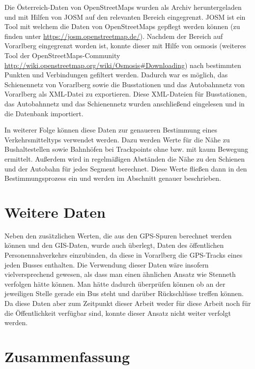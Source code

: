 Die Österreich-Daten von OpenStreetMaps wurden als Archiv heruntergeladen und mit Hilfen von JOSM auf den relevanten Bereich eingegrenzt. JOSM ist ein Tool mit welchem die Daten von OpenStreetMaps gepflegt werden können (zu finden unter \url{https://josm.openstreetmap.de/}). Nachdem der Bereich auf Vorarlberg eingegrenzt worden ist, konnte dieser mit Hilfe von osmosis (weiteres Tool der OpenStreetMaps-Community \url{http://wiki.openstreetmap.org/wiki/Osmosis#Downloading}) nach bestimmten Punkten und Verbindungen gefiltert werden. Dadurch war es möglich, das Schienennetz von Vorarlberg sowie die Busstationen und das Autobahnnetz von Vorarlberg als XML-Datei zu exportieren. Diese XML-Dateien für Busstationen, das Autobahnnetz und das Schienennetz wurden anschließend eingelesen und in die Datenbank importiert. 

In weiterer Folge können diese Daten zur genaueren Bestimmung eines Verkehrsmitteltyps verwendet werden. Dazu werden Werte für die Nähe zu Bushaltestellen sowie Bahnhöfen bei Trackpoints ohne bzw. mit kaum Bewegung ermittelt. Außerdem wird in regelmäßigen Abständen die Nähe zu den Schienen und der Autobahn für jedes Segment berechnet. Diese Werte fließen dann in den Bestimmungsprozess ein und werden im Abschnitt  genauer beschrieben.

\section{Weitere Daten}
Neben den zusätzlichen Werten, die aus den GPS-Spuren berechnet werden können und den GIS-Daten, wurde auch überlegt, Daten des öffentlichen Personennahverkehrs einzubinden, da diese in Vorarlberg die GPS-Tracks eines jeden Busses enthalten. Die Verwendung dieser Daten wäre insofern vielversprechend gewesen, als dass man einen ähnlichen Ansatz wie Stenneth verfolgen hätte können. Man hätte dadurch überprüfen können ob an der jeweiligen Stelle gerade ein Bus steht und darüber Rückschlüsse treffen können. Da diese Daten aber zum Zeitpunkt dieser Arbeit weder für diese Arbeit noch für die Öffentlichkeit verfügbar sind, konnte dieser Ansatz nicht weiter verfolgt werden.

\clearpage

\section{Zusammenfassung}
